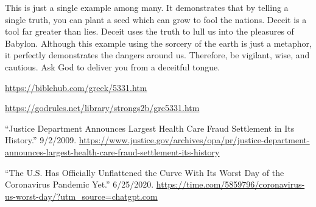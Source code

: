 \documentclass[10pt]{article}
\begin{document}
\begin{multicols}{2}
This is just a single example among many. It demonstrates that by telling a single truth, you can plant a seed which can grow to fool the nations. Deceit is a tool far greater than lies. Deceit uses the truth to lull us into the pleasures of Babylon. Although this example using the sorcery of the earth is just a metaphor, it perfectly demonstrates the dangers around us. Therefore, be vigilant, wise, and cautious. Ask God to deliver you from a deceitful tongue.

\end{multicols}

\begin{thebibliography}{9}
	{\footnotesize
		
		 \url{https://biblehub.com/greek/5331.htm}
		
		 \url{https://godrules.net/library/strongs2b/gre5331.htm}
		
		 ``Justice Department Announces Largest Health Care Fraud Settlement in Its History.'' 9/2/2009. \url{https://www.justice.gov/archives/opa/pr/justice-department-announces-largest-health-care-fraud-settlement-its-history}
		
		 ``The U.S. Has Officially Unflattened the Curve With Its Worst Day of the Coronavirus Pandemic Yet.'' 6/25/2020. \url{https://time.com/5859796/coronavirus-us-worst-day/?utm_source=chatgpt.com}
		
	}
\end{thebibliography}


\end{document}
